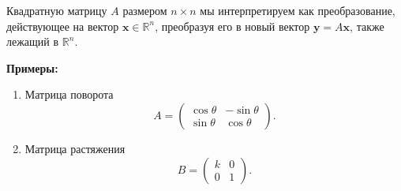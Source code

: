 \documentclass[11pt,a4paper]{article}
\providecommand{\tightlist}{%
      \setlength{\itemsep}{0pt}\setlength{\parskip}{0pt}}
\begin{document}
Квадратную матрицу \(A\) размером \(n \times n\) мы интерпретируем как
преобразование, действующее на вектор \(\mathbf{x} \in \mathbb{R}^n\),
преобразуя его в новый вектор \(\mathbf{y} = A\mathbf{x}\), также
лежащий в \(\mathbb{R}^n\).

\textbf{Примеры:}

\begin{enumerate}
\def\labelenumi{\arabic{enumi}.}
\tightlist
\item
  Матрица поворота \[
  A = 
  \begin{pmatrix}
    \cos{\theta} & -\sin{\theta} \\
    \sin{\theta} &  \cos{\theta}
  \end{pmatrix}.
\]

\item
  Матрица растяжения \[
    B = 
    \begin{pmatrix}
   k & 0 \\
   0 & 1
    \end{pmatrix}.
  \]
\end{enumerate}
\end{document}
